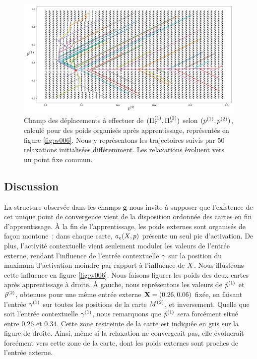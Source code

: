 \documentclass[../main]{subfiles}
\begin{document}
\begin{figure}
\centering
\includegraphics[width=\textwidth]{champ_006.pdf}
\caption{Champ des déplacements à effectuer de $(\Pi^{({1})}_\tau, \Pi^{({2})}_\tau)$ selon $(p^{({1})}, p^{({2})})$, calculé pour des poids organisés après apprentissage, représentés en figure \ref{fig:w006}. Nous y représentons les trajectoires suivis par 50 relaxations initialisées différemment. Les relaxations évoluent vers un point fixe commun.}
\label{fig:champ_9999}
\end{figure}

\subsection{Discussion}
La structure observée dans les champs $\mathbf{g}$ nous invite à supposer que l'existence de cet unique point de convergence vient de la disposition ordonnée des cartes en fin d'apprentissage. 
\`A la fin de l'apprentissage, les poids externes sont organisés de façon montone~: dans chaque carte, $a_e(X,p)$ présente un seul pic d'activation.
De plus, l'activité contextuelle vient seulement moduler les valeurs de l'entrée externe, rendant l'influence de l'entrée contextuelle $\gamma$ sur la position du maximum d'activation moindre par rapport à l'influence de $X$.
Nous illustrons cette influence en figure \ref{fig:w006}. 
Nous faisons figurer les poids des deux cartes après apprentissage à droite. 
\`A gauche, nous représentons les valeurs de $\hat{p}^{({1})}$ et $\hat{p}^{({2})}$, obtenues pour une même entrée externe $\mathbf{X} = (0.26, 0.06)$ fixée, en faisant l'entrée $\gamma^{({1})}$ sur toutes les positions de la carte $M^{({2})}$, et inversement.
Quelle que soit l'entrée contextuelle $\gamma^{({1})}$, nous remarquons que $\hat{p}^{({1})}$ sera forcément situé entre $0.26$ et $0.34$.
Cette zone restreinte de la carte est indiquée en gris sur la figure de droite.
Ainsi, même si la relaxation ne convergeait pas, elle évoluerait forcément vers cette zone de la carte, dont les poids externes sont proches de l'entrée externe.
\end{document}
